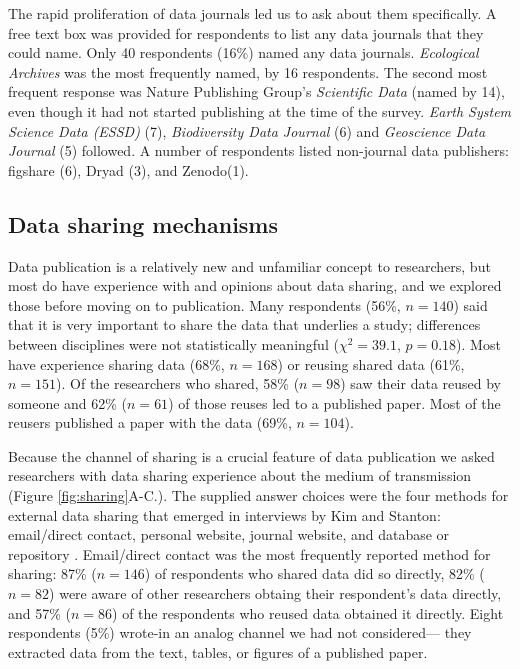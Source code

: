 \documentclass[10pt]{article}
\begin{document}
The rapid proliferation of data journals led us to ask about them specifically.
A free text box was provided for respondents to list any data journals that they could name.
Only 40 respondents (16\%) named any data journals. 
\emph{Ecological Archives} was the most frequently named, by 16 respondents. 
The second most frequent response was Nature Publishing Group's \emph{Scientific Data} (named by 14), even though it had not started publishing at the time of the survey.
\emph{Earth System Science Data (ESSD)} (7), \emph{Biodiversity Data Journal} (6) and \emph{Geoscience Data Journal} (5) followed.
A number of respondents listed non-journal data publishers: figshare (6), Dryad (3), and Zenodo(1).

\subsection*{Data sharing mechanisms}

Data publication is a relatively new and unfamiliar concept to researchers, but most do have experience with and opinions about data sharing, and we explored those before moving on to publication.
Many respondents (56\%, $n=140$) said that it is very important to share the data that underlies a study; differences between disciplines were not statistically meaningful ($\chi^{2}= 39.1$, $p= 0.18$). %
Most have experience sharing data (68\%, $n=168$) or reusing shared data (61\%, $n=151$).
Of the researchers who shared, 58\% ($n=98$) saw their data reused by someone and 62\% ($n=61$) of those reuses led to a published paper.
Most of the reusers published a paper with the data (69\%, $n=104$).

Because the channel of sharing is a crucial feature of data publication \cite{kratz_data_2014} we asked researchers with data sharing experience about the medium of transmission (Figure \ref{fig:sharing}A-C.).
The supplied answer choices were the four methods for external data sharing that emerged in interviews by Kim and Stanton: email/direct contact, personal website, journal website, and database or repository \cite{kim_institutional_2012}.
Email/direct contact was the most frequently reported method for sharing: 87\% ($n=146$) of respondents who shared data did so directly, 82\% ($n=82$) were aware of other researchers obtaing their respondent's data directly, and 57\% ($n=86$) of the respondents who reused data obtained it directly.
Eight respondents (5\%) wrote-in an analog channel we had not considered--- they extracted data from the text, tables, or figures of a published paper.
\end{document}
